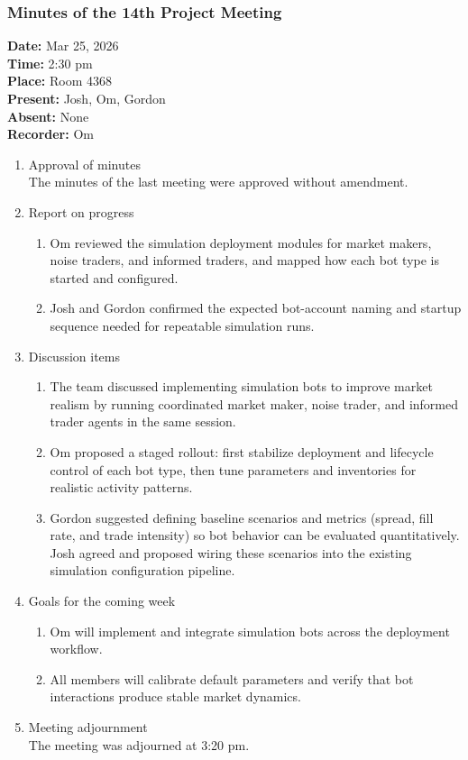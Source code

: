 \documentclass[12pt,a4paper]{article}
\begin{document}
\subsubsection{Minutes of the 14th Project Meeting}
\textbf{Date:} Mar 25, 2026\\
\textbf{Time:} 2:30 pm\\
\textbf{Place:} Room 4368\\
\textbf{Present:} Josh, Om, Gordon\\
\textbf{Absent:} None\\
\textbf{Recorder:} Om

\begin{enumerate}
\item Approval of minutes\\
The minutes of the last meeting were approved without amendment.\\
\item Report on progress
\begin{enumerate}
\item Om reviewed the simulation deployment modules for market makers, noise traders, and informed traders, and mapped how each bot type is started and configured.\\
\item Josh and Gordon confirmed the expected bot-account naming and startup sequence needed for repeatable simulation runs.\\
\end{enumerate}
\item Discussion items
\begin{enumerate}
\item The team discussed implementing simulation bots to improve market realism by running coordinated market maker, noise trader, and informed trader agents in the same session.\\
\item Om proposed a staged rollout: first stabilize deployment and lifecycle control of each bot type, then tune parameters and inventories for realistic activity patterns.\\
\item Gordon suggested defining baseline scenarios and metrics (spread, fill rate, and trade intensity) so bot behavior can be evaluated quantitatively. Josh agreed and proposed wiring these scenarios into the existing simulation configuration pipeline.\\
\end{enumerate}
\item Goals for the coming week
\begin{enumerate}
\item Om will implement and integrate simulation bots across the deployment workflow.\\
\item All members will calibrate default parameters and verify that bot interactions produce stable market dynamics.\\
\end{enumerate}
\item Meeting adjournment\\
The meeting was adjourned at 3:20 pm.
\end{enumerate}
\end{document}
